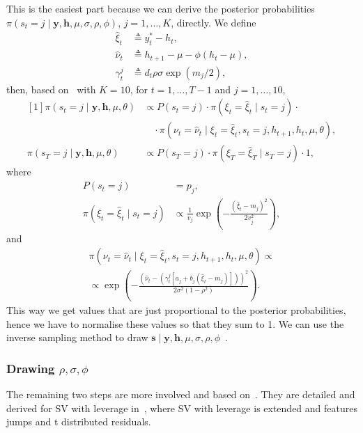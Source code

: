 This is the easiest part because we can derive the posterior probabilities $\pi(s_t=j\mid\bm{y},\bm{h},\mu,\sigma,\rho,\phi)$, $j=1,\dots,K$, directly.
We define
\begin{align*}
\hat\xi_t &\triangleq y_t^\ast-h_t, \\
\hat{\nu}_t &\triangleq h_{t+1}-\mu-\phi(h_t-\mu), \\
\gamma_t^j &\triangleq d_t\rho\sigma\exp(m_j/2),
\end{align*}
then, based on~\citet{Omori2007} with $K=10$, for $t=1,\dots,T-1$ and $j=1,\dots,10$,
\begin{equation}
\begin{aligned}[1]
\pi\left(s_t=j\mid\bm{y},\bm{h},\mu,\theta\right) &\propto P\left(s_t=j\right)\cdot\pi\left(\xi_t=\hat\xi_t\mid s_t=j\right)\cdot \\
&\quad\cdot\pi\left(\nu_t=\hat\nu_t\mid\xi_t=\hat\xi_t,s_t=j,h_{t+1},h_t,\mu,\theta\right), \\
\pi\left(s_T=j\mid\bm{y},\bm{h},\mu,\theta\right)
&\propto P\left(s_T=j\right)\cdot\pi\left(\xi_T=\hat\xi_T\mid s_T=j\right)\cdot 1,
\end{aligned}
\end{equation}
where
\begin{align*}
P\left(s_t=j\right) &= p_j, \\
\pi\left(\xi_t=\hat\xi_t\mid s_t=j\right) &\propto \frac{1}{v_j}\exp\left(-\frac{\left(\hat\xi_t-m_j\right)^2}{2v_j^2}\right),
\end{align*}
and
\begin{multline*}
\pi\left(\nu_t=\hat\nu_t\mid\xi_t=\hat\xi_t,s_t=j,h_{t+1},h_t,\mu,\theta\right) \propto \\
\propto \exp\left(-\frac{\left(\hat{\nu}_t-\left(\gamma_t^j\left[a_j+b_j\left(\hat\xi_t-m_j\right)\right]\right)\right)^2}{2\sigma^2\left(1-\rho^2\right)}\right).
\end{multline*}
This way we get values that are just proportional to the posterior probabilities, hence we have to normalise these values so that they sum to 1.
We can use the inverse sampling method to draw $\bm s\mid\bm{y},\bm{h},\mu,\sigma,\rho,\phi$~\citep{grinstead2012introduction}.

\subsubsection{Drawing $\rho,\sigma,\phi$}

The remaining two steps are more involved and based on~\citet{de1995simulation}.
They are detailed and derived for SV with leverage in~\citet{Nakajima2009}, where SV with leverage is extended and features jumps and t distributed residuals.

